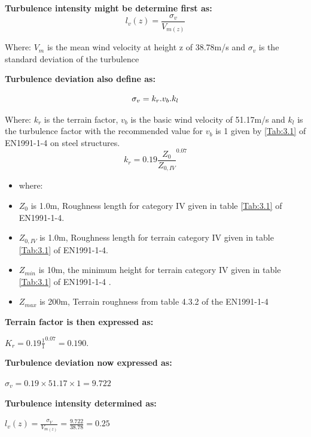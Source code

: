 {\textbf{ Turbulence intensity might be determine first as:}
\begin{equation}
l_v(z) =  \frac{\sigma_v}{V_{m\left(z\right)}}
\end{equation}

Where:  \(V_m\) is the mean wind velocity at height z of 38.78m/s and \(\sigma_v\)  is the standard deviation of the turbulence 

\textbf{ Turbulence deviation also define as:}

\begin{equation}
\sigma_v = k_r . v_b. k_l\\
\end{equation}

Where: \(k_r\) is the terrain factor, \(v_b\) is the basic wind velocity of 51.17m/s and \(k_l\) is the turbulence factor with the recommended value for \(v_b\) is 1 given by \ref{Tab:3.1} of EN1991-1-4 \cite{en19911} on steel structures.
\begin{equation}
k_r = 0.19 {\frac{Z_0}{Z_{0,IV}}}^{0.07}
\end{equation}

\begin{itemize}[label={}]
    \item where:
\item \(Z_0\) is 1.0m, Roughness length for category IV given in table \ref{Tab:3.1} of EN1991-1-4.
\item \(Z_{0,IV}\) is 1.0m, Roughness length for terrain category IV given in table \ref{Tab:3.1} of EN1991-1-4.
\item \(Z_{min}\) is 10m, the minimum height for terrain category IV given in table \ref{Tab:3.1} of EN1991-1-4 .
\item \(Z_{max}\) is  200m, Terrain roughness from table 4.3.2 of the EN1991-1-4 \cite{en19911}
\end{itemize}

\textbf{Terrain factor is then expressed as:}
\begin{center}
    \(K_r = 0.19 {\frac{1}{1}}^{0.07} = 0.190\).
\end{center}


\textbf{Turbulence deviation now expressed as:}

\begin{center}
        \(\sigma_v = 0.19\times51.17\times1 = 9.722\)
\end{center}

\textbf{Turbulence intensity determined as:}

\begin{center}
    \(l_v(z) =  \frac{\sigma_V}{V_{m\left(z\right)}} =  \frac{9.722}{38.78}  =  0.25\)
\end{center}



}
